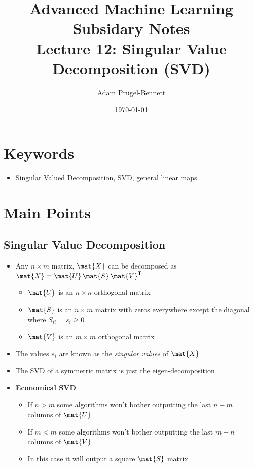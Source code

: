 \documentclass[11pt]{article}
\author{Adam Prügel-Bennett}
\date{\today}
\title{Advanced Machine Learning Subsidary Notes\\\medskip
\large Lecture 12: Singular Value Decomposition (SVD)}
\newcommand{\tr}{\textsf{T}}
\begin{document}
\maketitle


\section{Keywords}
\label{sec:org884d725}
\begin{itemize}
\item Singular Valued Decomposition, SVD, general linear maps
\end{itemize}

\section{Main Points}
\label{sec:orgd0fb5f5}

\subsection{Singular Value Decomposition}
\label{sec:orgc1944e5}
\begin{itemize}
\item Any \(n\times m\) matrix, \(\mat{X}\) can be decomposed as \(\mat{X} = \mat{U}\,\mat{S}\,\mat{V}^\tr\)
\begin{itemize}
\item \(\mat{U}\) is an \(n\times n\) orthogonal matrix
\item \(\mat{S}\) is an \(n\times m\)  matrix with zeros everywhere except the diagonal where \(S_{ii}=s_i\geq0\)
\item \(\mat{V}\) is an \(m\times m\) orthogonal matrix
\end{itemize}
\item The values \(s_i\) are known as the \emph{singular values} of \(\mat{X}\)
\item The SVD of a symmetric matrix is just the eigen-decomposition
\item \textbf{Economical SVD}
\begin{itemize}
\item If \(n>m\) some algorithms won't bother outputting the last \(n-m\) columns of \(\mat{U}\)
\item If \(m<m\) some algorithms won't bother outputting the last \(m-n\) columns of \(\mat{V}\)
\item In this case it will output a square \(\mat{S}\) matrix
\end{itemize}
\end{itemize}
\end{document}
